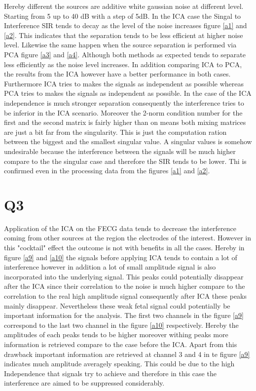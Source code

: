 Hereby different the sources are additive white gaussian noise at different level. Starting from 5 up to 40 dB with a step of 5dB. In the ICA case the Singal to Interference SIR tends to decay as the level of the noise increases figure \ref{a1} and \ref{a2}. This indicates that the separation tends to be less efficient at higher noise level. Likewise the same happen when the source separation is performed via PCA figure \ref{a3} and \ref{a4}. Although both methods as expected tends to separate less efficiently as the noise level increases. In addition comparing ICA to PCA, the results from the ICA however have a better performance in both cases. Furthermore ICA tries to makes the signals as independent as possible whereas PCA tries to makes the signals as independent as possible. In the case of the ICA independence is much stronger separation consequently the interference tries to be inferior in the ICA scenario. Moreover the 2-norm condition number for the first and the second matrix is fairly higher than on means both mixing matrices are just a bit far from the singularity. This is just the computation ration between the biggest and the smallest singular value. A singular values is somehow undesirable because the interference between the signals will be much higher compare to the the singular case and therefore the SIR tends to be lower. Thi is confirmed even in the processing data from the figures \ref{a1} and \ref{a2}.  


\section{Q3}

Application of the ICA on the FECG data tends to decrease the interference coming from other sources at the region the electrodes of the interest. However in this "cocktail" effect the outcome is not with benefits in all the cases. Hereby in figure \ref{a9} and \ref{a10} the signals before applying ICA tends to contain a lot of interference however in addition a lot of small amplitude signal is also incorporated into the underlying signal. This peaks could potentially disappear after the ICA since their correlation to the noise is much higher compare to the correlation to the real high amplitude signal consequently after ICA these peaks mainly disappear.  Nevertheless these weak fetal signal could potentially be important information for the analysis. The first two channels in the figure \ref{a9} correspond to the last two channel in the figure \ref{a10} respectively. Hereby the amplitudes of each peaks tends to be higher moreover withing peaks more information is retrieved compare to the case before the ICA. Apart from this drawback important information are retrieved at channel 3 and 4 in te figure \ref{a9} indicates much amplitude averagely speaking. This could be due to the high Independence that signals try to achieve and therefore in this case the interference are aimed to be suppressed considerably. 

